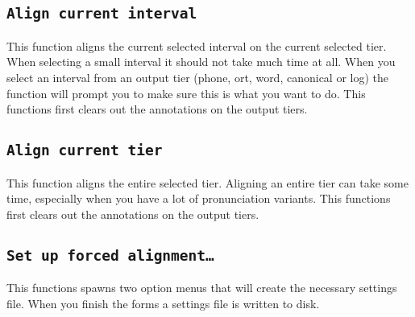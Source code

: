 \subsection{\texttt{Align current interval}}
This function aligns the current selected interval on the current selected
tier. When selecting a small interval it should not take much time at all. When
you select an interval from an output tier (phone, ort, word, canonical or log)
the function will prompt you to make sure this is what you want to do. This
functions first clears out the annotations on the output tiers.

\subsection{\texttt{Align current tier}}
This function aligns the entire selected tier. Aligning an entire tier can take
some time, especially when you have a lot of pronunciation variants. This
functions first clears out the annotations on the output tiers.

\subsection{\texttt{Set up forced alignment\ldots}}
This functions spawns two option menus that will create the necessary settings
file. When you finish the forms a settings file is written to disk.

